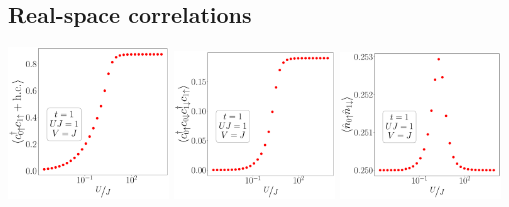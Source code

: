 \documentclass{report}
\numberwithin{equation}{section}
\begin{document}
\subsection*{Real-space correlations}
\begin{center}
	\includegraphics[width=0.32\textwidth]{../figures/r1p-t=1.000,J=1_over_U,V=J,N=6,U=0.016,91.116,32.pdf}
	\includegraphics[width=0.32\textwidth]{../figures/r-od-t=1.000,J=1_over_U,V=J,N=6,U=0.016,91.116,32.pdf}
	\includegraphics[width=0.32\textwidth]{../figures/r-opp-t=1.000,J=1_over_U,V=J,N=4,U=0.016,91.116,32.pdf}


\end{center}
\end{document}

